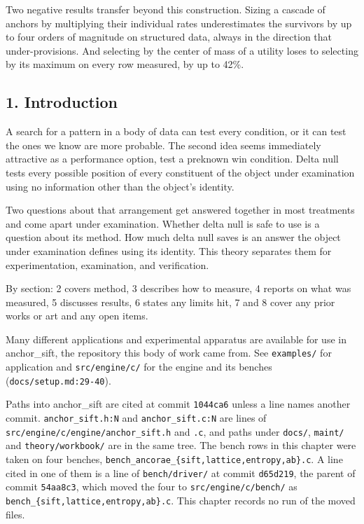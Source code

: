 Two negative results transfer beyond this construction. Sizing a cascade of anchors by multiplying their individual rates underestimates the survivors by up to four orders of magnitude on structured data, always in the direction that under-provisions. And selecting by the center of mass of a utility loses to selecting by its maximum on every row measured, by up to 42\%.

\subsection{1. Introduction}

A search for a pattern in a body of data can test every condition, or it can test the ones we know
are more probable. The second idea seems immediately attractive as a performance option,
test a preknown win condition. Delta null tests every possible position of every constituent of the
object under examination using no information other than the object's identity.

Two questions about that arrangement get answered together in most treatments and come apart under
examination. Whether delta null is safe to use is a question about its method. How much delta null
saves is an answer the object under examination defines using its identity. This theory separates
them for experimentation, examination, and verification.

By section: 2 covers method, 3 describes how to measure, 4 reports on what was measured, 5
discusses results, 6 states any limits hit, 7 and 8 cover any prior works or art and any open
items.

Many different applications and experimental apparatus are available for use in anchor\_sift, the
repository this body of work came from. See \texttt{examples/\allowbreak{}} for application and
\texttt{src/\allowbreak{}engine/\allowbreak{}c/\allowbreak{}} for the engine and its benches
(\texttt{docs/\allowbreak{}setup.md:29-\allowbreak{}40}).

Paths into anchor\_sift are cited at commit \texttt{1044ca6} unless a line names another commit.
\texttt{anchor\_sift.h:N} and \texttt{anchor\_sift.c:N} are lines of
\texttt{src/\allowbreak{}engine/\allowbreak{}c/\allowbreak{}engine/\allowbreak{}anchor\_sift.h} and
\texttt{.c}, and paths under \texttt{docs/\allowbreak{}}, \texttt{maint/\allowbreak{}} and
\texttt{theory/\allowbreak{}workbook/\allowbreak{}} are in the same tree. The bench rows in this
chapter were taken on four benches,
\texttt{bench\_\allowbreak{}ancorae\_\allowbreak{}\{sift,\allowbreak{}lattice,\allowbreak{}entropy,\allowbreak{}ab\}.\allowbreak{}c}.
A line cited in one of them is a line of \texttt{bench/\allowbreak{}driver/\allowbreak{}} at commit
\texttt{d65d219}, the parent of commit \texttt{54aa8c3}, which moved the four to
\texttt{src/\allowbreak{}engine/\allowbreak{}c/\allowbreak{}bench/\allowbreak{}} as
\texttt{bench\_\allowbreak{}\{sift,\allowbreak{}lattice,\allowbreak{}entropy,\allowbreak{}ab\}.\allowbreak{}c}.
This chapter records no run of the moved files.

